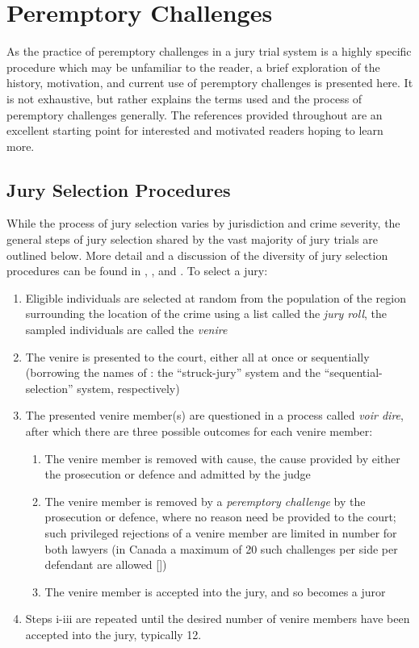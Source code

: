 \chapter{Peremptory Challenges} \label{c:background}

As the practice of peremptory challenges in a jury trial system is a highly specific procedure which may be unfamiliar to the
reader, a brief exploration of the history, motivation, and current use of peremptory challenges is presented here. It is not
exhaustive, but rather explains the terms used and the process of peremptory challenges generally. The references provided
throughout are an excellent starting point for interested and motivated readers hoping to learn more.

\section{Jury Selection Procedures} \label{sec:jurysel}

While the process of jury selection varies by jurisdiction and crime severity, the general steps of jury selection shared by the
vast majority of jury trials are outlined below. More detail and a discussion of the diversity of jury selection procedures can be
found in \cite{ford2010}, \cite{hansvidjudging}, and \cite{vandykejurysel}. To select a jury:

\begin{enumerate}
  \item Eligible individuals are selected at random from the population of the region surrounding the location of the crime using
    a list called the \textit{jury roll}, the sampled individuals are called the \textit{venire}
  \item The venire is presented to the court, either all at once or sequentially (borrowing the names of \cite{ford2010}: the
    ``struck-jury'' system and the ``sequential-selection'' system, respectively)
  \item The presented venire member(s) are questioned in a process called \textit{voir dire}, after which there are three possible
    outcomes for each venire member:
    \begin{enumerate}
      \item The venire member is removed with cause, the cause provided by either the prosecution or defence and admitted by
        the judge
      \item The venire member is removed by a \textit{peremptory challenge} by the prosecution or defence, where no reason
        need be provided to the court; such privileged rejections of a venire member are limited in number for both lawyers (in
        Canada a maximum of 20 such challenges per side per defendant are allowed [\cite{perempchallaw}])
      \item The venire member is accepted into the jury, and so becomes a juror
    \end{enumerate}
  \item Steps i-iii are repeated until the desired number of venire members have been accepted into the jury, typically 12.
\end{enumerate}

